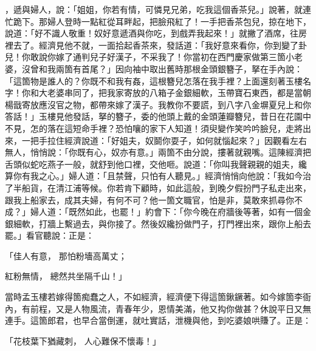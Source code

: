 ，遞與婦人，說：「姐姐，你若有情，可憐見兄弟，吃我這個香茶兒。」說著，就連忙跪下。那婦人登時一點紅從耳畔起，把臉飛紅了！一手把香茶包兒，掠在地下，說道：「好不識人敬重！奴好意遞酒與你吃，到戲弄我起來！」就撇了酒席，往房裡去了。經濟見他不就，一面拾起香茶來，發話道：「我好意來看你，你到變了卦兒！你敢說你嫁了通判兒子好漢子，不采我了！你當初在西門慶家做第三箇小老婆，沒曾和我兩箇有首尾？」因向袖中取出舊時那根金頭銀簪子，拏在手內說：「這箇物是誰人的？你既不和我有姦，這根簪兒怎落在我手裡？上面還刻著玉樓名字！你和大老婆串同了，把我家寄放的八箱子金銀細軟，玉帶寶石東西，都是當朝楊戩寄放應沒官之物，都帶來嫁了漢子。我教你不要謊，到八字八金塀夏兒上和你答話！」玉樓見他發話，拏的簪子，委的他頭上戴的金頭蓮瓣簪兒，昔日在花園中不見，怎的落在這短命手裡？恐怕嚷的家下人知道！須臾變作笑吟吟臉兒，走將出來，一把手拉住經濟說道：「好姐夫，奴鬬你耍子，如何就惱起來？」因觀看左右無人，悄悄說：「你既有心，奴亦有意。」兩箇不由分說，摟著就親嘴。這陳經濟把舌頭似蛇吃燕子一般，就舒到他口裡，交他咂。說道：「你叫我聲親親的姐夫，纔算你有我之心。」婦人道：「且禁聲，只怕有人聽見。」經濟悄悄向他說：「我如今治了半船貨，在清江浦等候。你若肯下顧時，如此這般，到晚夕假扮門子私走出來，跟我上船家去，成其夫婦，有何不可？他一箇文職官，怕是非，莫敢來抓尋你不成？」婦人道：「既然如此，也罷！」約會下：「你今晚在府牆後等著，如有一個金銀細軟，打牆上繫過去，與你接了。然後奴纔扮做門子，打門裡出來，跟你上船去罷。」看官聽說：正是：

「佳人有意，  那怕粉墻高萬丈；

紅粉無情，  總然共坐隔千山！」

當時孟玉樓若嫁得箇痴蠢之人，不如經濟，經濟便下得這箇鍬鐝著。如今嫁箇李衙內，有前程，又是人物風流，青春年少，恩情美滿，他又抅你做甚？休說平日又無連手。這箇郎君，也早合當倒運，就吐實話，泄機與他，到吃婆娘哄賺了。正是：

「花枝葉下猶藏刺，  人心難保不懷毒！」

